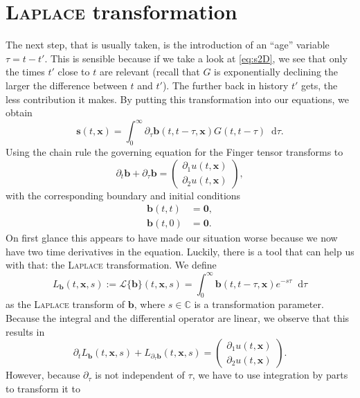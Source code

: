 \documentclass[12pt,a4paper,twoside, open=right]{scrreprt}
\theoremstyle{definition}
\theoremstyle{plain}
\newcommand{\cc}{\mathbb{C}}
\newcommand{\bfb}{\bm{b}}
\newcommand{\bfs}{\bm{s}}
\newcommand{\bfx}{\bm{x}}
\newcommand{\D}{\mathop{}\!\mathrm{d}}
\begin{document}
\section{\textsc{Laplace} transformation}
The next step, that is usually taken, is the introduction of an \enquote{age} variable $\tau=t-t'$. This is sensible because if we take a look at \eqref{eq:s2D}, we see that only the times $t'$ close to $t$ are relevant (recall that $G$ is exponentially declining the larger the difference between $t$ and $t'$). The further back in history $t'$ gets, the less contribution it makes. By putting this transformation into our equations, we obtain
\begin{equation}
    \bfs(t,\bfx)=\int_0^\infty\partial_\tau\bfb(t,t-\tau,\bfx)G(t,t-\tau)\D\tau.\label{eq:sage}
\end{equation}
Using the chain rule the governing equation for the Finger tensor transforms to  
\begin{equation}
    \partial_t \bfb +\partial_\tau\bfb = \begin{pmatrix}
    \partial_1 u(t,\bfx)\\\partial_2 u(t,\bfx)
    \end{pmatrix},
\end{equation}
with the corresponding boundary and initial conditions
\begin{align}
    \bfb(t,t) &= \bm{0},\\
    \bfb(t,0) &= \bm{0}.
\end{align}
On first glance this appears to have made our situation worse because we now have two time derivatives in the equation. Luckily, there is a tool that can help us with that: the \textsc{Laplace} transformation. We define
\begin{equation}
L_{\bfb}(t,\bfx,s) := \mathcal{L}\{\bfb\}(t,\bfx,s)=\int_0^\infty\bfb(t,t-\tau,\bfx)e^{-s\tau}\D\tau
\end{equation}
as the \textsc{Laplace} transform of $\bfb$, where $s\in\cc$ is a transformation parameter. 
Because the integral and the differential operator are linear, we observe that this results in
\begin{equation}
    \partial_tL_{\bfb}(t,\bfx,s) + L_{\partial_\tau\bfb}(t,\bfx,s) = \begin{pmatrix}
    \partial_1 u(t,\bfx)\\\partial_2 u(t,\bfx)
    \end{pmatrix}.
\end{equation}
However, because $\partial_\tau$ is not independent of $\tau$, we have to use integration by parts to transform it to
\end{document}
